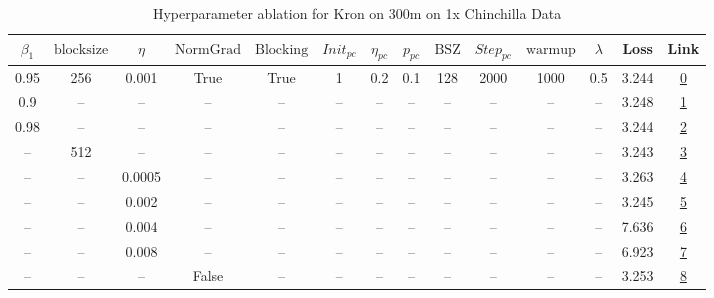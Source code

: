 \begin{table}[H]
\centering
\caption{Hyperparameter ablation for Kron on 300m on 1x Chinchilla Data}
\label{tab:ablation_kron_300m_1}
\begin{tabular}{cccccccccccccc}
\toprule
$\beta_1$ & $\mathrm{block size}$ & $\eta$ & $\mathrm{NormGrad}$ & $\mathrm{Blocking}$ & $Init_{pc}$ & $\eta_{pc}$ & $p_{pc}$ & $\mathrm{BSZ}$ & $Step_{pc}$ & $\mathrm{warmup}$ & $\lambda$ & Loss & Link \\
\midrule
0.95 & 256 & 0.001 & True & True & 1 & 0.2 & 0.1 & 128 & 2000 & 1000 & 0.5 & 3.244 & \href{https://wandb.ai/stanford-mercury/optimizer-scaling/runs/sweep-300m-6B-kron9fb147lr0.001-wd0.5-b10.95-plr0.2-pis1-gn1-nor-d54c60}{0} \\
\midrule
0.9 & -- & -- & -- & -- & -- & -- & -- & -- & -- & -- & -- & 3.248 & \href{https://wandb.ai/stanford-mercury/optimizer-scaling/runs/sweep-300m-6B-kron9ac4c0lr0.001-wd0.5-b10.9-plr0.2-pis1-gn1-norm-2f58ed}{1} \\
0.98 & -- & -- & -- & -- & -- & -- & -- & -- & -- & -- & -- & 3.244 & \href{https://wandb.ai/stanford-mercury/optimizer-scaling/runs/sweep-300m-6B-kron06f9b7lr0.001-wd0.5-b10.98-plr0.2-pis1-gn1-nor-67674b}{2} \\
-- & 512 & -- & -- & -- & -- & -- & -- & -- & -- & -- & -- & 3.243 & \href{https://wandb.ai/stanford-mercury/optimizer-scaling/runs/sweep-300m-6B-kron1bfdd1lr0.001-wd0.5-b10.95-plr0.2-pis1-gn1-nor-534bfe}{3} \\
-- & -- & 0.0005 & -- & -- & -- & -- & -- & -- & -- & -- & -- & 3.263 & \href{https://wandb.ai/stanford-mercury/optimizer-scaling/runs/sweep-300m-6B-kron4eb26flr0.0005-wd0.5-b10.95-plr0.2-pis1-gn1-no-3b9228}{4} \\
-- & -- & 0.002 & -- & -- & -- & -- & -- & -- & -- & -- & -- & 3.245 & \href{https://wandb.ai/stanford-mercury/optimizer-scaling/runs/sweep-300m-6B-krond49014lr0.002-wd0.5-b10.95-plr0.2-pis1-gn1-nor-b57c7c}{5} \\
-- & -- & 0.004 & -- & -- & -- & -- & -- & -- & -- & -- & -- & 7.636 & \href{https://wandb.ai/stanford-mercury/optimizer-scaling/runs/sweep-300m-6B-kron351c0clr0.004-wd0.5-b10.95-plr0.2-pis1-gn1-nor-dea42d}{6} \\
-- & -- & 0.008 & -- & -- & -- & -- & -- & -- & -- & -- & -- & 6.923 & \href{https://wandb.ai/stanford-mercury/optimizer-scaling/runs/sweep-300m-6B-kronb28e04lr0.008-wd0.5-b10.95-plr0.2-pis1-gn1-nor-8d91a1}{7} \\
-- & -- & -- & False & -- & -- & -- & -- & -- & -- & -- & -- & 3.253 & \href{https://wandb.ai/stanford-mercury/optimizer-scaling/runs/sweep-300m-6B-kronbd9170lr0.001-wd0.5-b10.95-plr0.2-pis1-gn1-nor-0add5a}{8} \\

\end{tabular}
\end{table}
